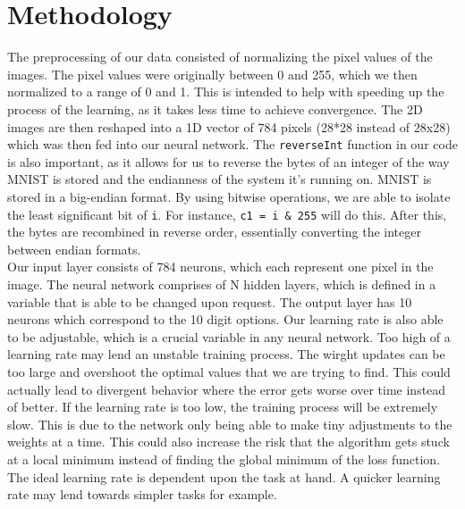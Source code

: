 \documentclass[12pt, twocolumn]{report}
\begin{document}
\section*{Methodology}
The preprocessing of our data consisted of normalizing the pixel values of the images. The pixel values were originally between
0 and 255, which we then normalized to a range of 0 and 1. This is intended to help with speeding up the
process of the learning, as it takes less time to achieve convergence. The 2D images are then reshaped into a 1D vector of 784 pixels (28*28 instead of 28x28) which
was then fed into our neural network. The \texttt{reverseInt} function in our code is also important, as it
allows for us to reverse the bytes of an integer of the way MNIST is stored and the endianness of the system it's running on.
MNIST is stored in a big-endian format. By using bitwise operations, we are able to isolate the least significant bit of \texttt{i}. For instance,
\texttt{c1 = i \& 255} will do this. After this, the bytes are recombined in reverse order, essentially converting the integer between endian formats.
\\




Our input layer consists of 784 neurons, which each represent one pixel in the image. The neural network comprises of N hidden layers, which is defined
in a variable that is able to be changed upon request. The output layer has 10 neurons which correspond to the 10 digit options. Our learning rate is also able to be adjustable, which
is a crucial variable in any neural network. Too high of a learning rate may lend an unstable training process. The wirght updates
can be too large and overshoot the optimal values that we are trying to find. This could actually lead to divergent behavior where the error gets worse over
time instead of better. If the learning rate is too low, the training process will be extremely slow. This is due to
the network only being able to make tiny adjustments to the weights at a time. This could also increase the risk that the algorithm gets stuck at a local minimum instead
of finding the global minimum of the loss function. The ideal learning rate is dependent upon the task at hand. A quicker learning rate
may lend towards simpler tasks for example.
\\
\end{document}
